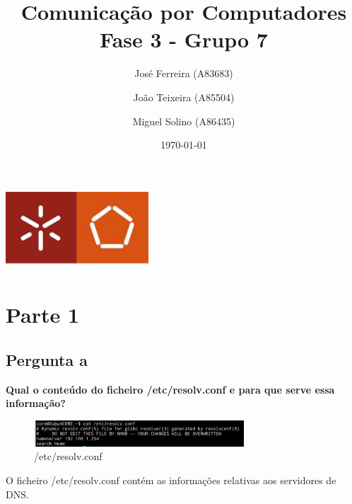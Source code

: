\documentclass[a4paper]{report}
\begin{document}
\title{Comunicação por Computadores\\ 
\large Fase 3 - Grupo 7}
\author{José Ferreira (A83683) \and João Teixeira (A85504) \and Miguel Solino (A86435)}
\date{\today}

\begin{center}
    \begin{minipage}{0.75\linewidth}
        \centering
        \includegraphics[width=0.4\textwidth]{images/eng.jpeg}\par\vspace{1cm}
        \vspace{1.5cm}
        \href{https://www.uminho.pt/PT}
        {\color{black}{\scshape\LARGE Universidade do Minho}} \par
        \vspace{1cm}
        \href{https://www.di.uminho.pt/}
        {\color{black}{\scshape\Large Departamento de Informática}} \par
        \vspace{1.5cm}
        \maketitle
    \end{minipage}
\end{center}

\chapter{Parte 1}
\section{Pergunta a}
\textbf{Qual o conteúdo do ficheiro /etc/resolv.conf e para que serve essa
informação?}

\begin{figure}[H]
    \centering 
    \includegraphics[width=0.7\textwidth]{images/resolv.png}  
    \caption{/etc/resolv.conf}
    \label{fig:resolv}
\end{figure}
O ficheiro /etc/resolv.conf contém as informações relativas aos servidores
de DNS.
\end{document}
